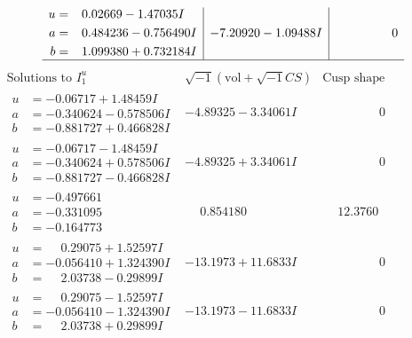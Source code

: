 \documentclass[1p]{elsarticle_modified}
\theoremstyle{definition}
\newcommand{\I}{\sqrt{-1}}
\begin{document}
$$\begin{array}{c|c|c}
\begin{aligned}
u &= \phantom{-}0.02669 - 1.47035 I \\
a &= \phantom{-}0.484236 - 0.756490 I \\
b &= \phantom{-}1.099380 + 0.732184 I\end{aligned}
 & -7.20920 - 1.09488 I & \phantom{-0.000000 } 0\\
 \hline 
 \end{array}$$\newpage$$\begin{array}{c|c|c}  
\text{Solutions to }I^u_{1}& \I (\text{vol} + \sqrt{-1}CS) & \text{Cusp shape}\\
 \hline 
\begin{aligned}
u &= -0.06717 + 1.48459 I \\
a &= -0.340624 - 0.578506 I \\
b &= -0.881727 + 0.466828 I\end{aligned}
 & -4.89325 - 3.34061 I & \phantom{-0.000000 } 0 \\ \hline\begin{aligned}
u &= -0.06717 - 1.48459 I \\
a &= -0.340624 + 0.578506 I \\
b &= -0.881727 - 0.466828 I\end{aligned}
 & -4.89325 + 3.34061 I & \phantom{-0.000000 } 0 \\ \hline\begin{aligned}
u &= -0.497661\phantom{ +0.000000I} \\
a &= -0.331095\phantom{ +0.000000I} \\
b &= -0.164773\phantom{ +0.000000I}\end{aligned}
 & \phantom{-}0.854180\phantom{ +0.000000I} & \phantom{-}12.3760\phantom{ +0.000000I} \\ \hline\begin{aligned}
u &= \phantom{-}0.29075 + 1.52597 I \\
a &= -0.056410 + 1.324390 I \\
b &= \phantom{-}2.03738 - 0.29899 I\end{aligned}
 & -13.1973 + 11.6833 I & \phantom{-0.000000 } 0 \\ \hline\begin{aligned}
u &= \phantom{-}0.29075 - 1.52597 I \\
a &= -0.056410 - 1.324390 I \\
b &= \phantom{-}2.03738 + 0.29899 I\end{aligned}
 & -13.1973 - 11.6833 I & \phantom{-0.000000 } 0 \\ \hline\begin{aligned}

\end{aligned}
\end{array}$$
\end{document}

